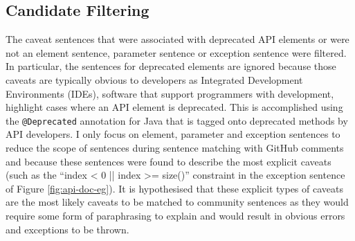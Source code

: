 \subsection{Candidate Filtering}
\label{subsec:info-candidate-filtering}
The caveat sentences that were associated with deprecated API elements or were not an element sentence, parameter sentence or exception sentence were filtered. In particular, the sentences for deprecated elements are ignored because those caveats are typically obvious to developers as Integrated Development Environments (IDEs), software that support programmers with development, highlight cases where an API element is deprecated. This is accomplished using the \lstinline{@Deprecated} annotation for Java that is tagged onto deprecated methods by API developers. I only focus on element, parameter and exception sentences to reduce the scope of sentences during sentence matching with GitHub comments and because these sentences were found to describe the most explicit caveats (such as  the ``index < 0 || index >= size()'' constraint in the exception sentence of Figure \ref{fig:api-doc-eg}). It is hypothesised that these explicit types of caveats are the most likely caveats to be matched to community sentences as they would require some form of paraphrasing to explain and would result in obvious errors and exceptions to be thrown.\bigbreak

